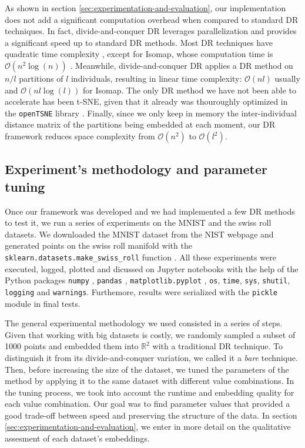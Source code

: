 As shown in section \ref{sec:experimentation-and-evaluation}, our implementation does not add a significant computation overhead when compared to standard DR techniques. In fact, divide-and-conquer DR leverages parallelization and provides a significant speed up to standard DR methods. Most DR techniques have quadratic time complexity \citep{Kruskal1964a,Kruskal1964b,Chen2009, Vandermaaten2008}, except for Isomap, whose computation time is $\mathcal{O}(n^2\log(n))$ \citep{Tenenbaum2000}. Meanwhile, divide-and-conquer DR applies a DR method on $n/l$ partitions of $l$ individuals, resulting in linear time complexity: $\mathcal{O}(nl)$ usually and $\mathcal{O}(nl\log(l))$ for Isomap. The only DR method we have not been able to accelerate has been t-SNE, given that it already was thouroughly optimized in the \verb|openTSNE| library \citep{Policar2024}. Finally, since we only keep in memory the inter-individual distance matrix of the partitions being embedded at each moment, our DR framework reduces space complexity from $\mathcal{O}(n^2)$ to $\mathcal{O}(l^2)$.


\subsection{Experiment's methodology and parameter tuning}
\label{sec:experiment-methodology-parameter-tuning}

Once our framework was developed and we had implemented a few DR methods to test it, we run a series of experiments on the MNIST \citep{Cohen2017} and the swiss roll \citep{Tenenbaum2000} datasets. We downloaded the MNIST dataset from the NIST webpage \citep{NIST2024} and generated points on the swiss roll manifold with the \verb|sklearn.datasets.make_swiss_roll| function \citep{Pedregosa2011}. All these experiments were executed, logged, plotted and dicussed on Jupyter notebooks \citep{Kluyver2016} with the help of the Python packages \verb|numpy| \citep{Harris2020}, \verb|pandas| \citep{Mckinney2010}, \verb|matplotlib.pyplot| \citep{Hunter2007}, \verb|os|, \verb|time|, \verb|sys|, \verb|shutil|, \verb|logging| and \verb|warnings|. Furthemore, results were serialized with the \verb|pickle| module in final tests.

The general experimental methodology we used consisted in a series of steps. Given that working with big datasets is costly, we randomly sampled a subset of 1000 points and embedded them into $\mathbb{R}^2$ with a traditional DR technique. To distinguish it from its divide-and-conquer variation, we called it a \textit{bare} technique. Then, before increasing the size of the dataset, we tuned the parameters of the method by applying it to the same dataset with different value combinations. In the tuning process, we took into account the runtime and embedding quality for each value combination. Our goal was to find parameter values that provided a good trade-off between speed and preserving the structure of the data. In section \ref{sec:experimentation-and-evaluation}, we enter in more detail on the qualitative assesment of each dataset's embeddings.


